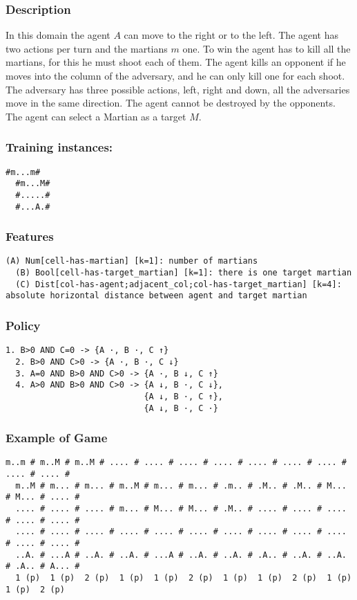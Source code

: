 \documentclass[a4paper]{article}
\begin{document}
\subsubsection{Description}
In this domain the agent $A$ can move to the right or to the left. The agent has two actions per turn and the martians $m$ one. To win the agent has to kill all the martians, for this he must shoot each of them. The agent kills an opponent if he moves into the column of the adversary, and he can only kill one for each shoot. The adversary has three possible actions, left, right and down, all the adversaries move in the same direction. The agent cannot be destroyed by the opponents. The agent can select a Martian as a target $M$.

\subsubsection{Training instances:}
\begin{Verbatim}[fontsize=\footnotesize]
  #m...m#
  #m...M#
  #.....#
  #...A.#
\end{Verbatim}

\subsubsection{Features}
\begin{Verbatim}[fontsize=\footnotesize]
  (A) Num[cell-has-martian] [k=1]: number of martians
  (B) Bool[cell-has-target_martian] [k=1]: there is one target martian
  (C) Dist[col-has-agent;adjacent_col;col-has-target_martian] [k=4]: absolute horizontal distance between agent and target martian
\end{Verbatim}

\subsubsection{Policy}
\begin{Verbatim}[fontsize=\footnotesize]
  1. B>0 AND C=0 -> {A ·, B ·, C ↑}
  2. B>0 AND C>0 -> {A ·, B ·, C ↓}
  3. A=0 AND B>0 AND C>0 -> {A ·, B ↓, C ↑}
  4. A>0 AND B>0 AND C>0 -> {A ↓, B ·, C ↓},
                            {A ↓, B ·, C ↑},
                            {A ↓, B ·, C ·}
\end{Verbatim}

\subsubsection{Example of Game}
\begin{Verbatim}[fontsize=\footnotesize]
  m..m # m..M # m..M # .... # .... # .... # .... # .... # .... # .... # .... # .... #
  m..M # m... # m... # m..M # m... # m... # .m.. # .M.. # .M.. # M... # M... # .... #
  .... # .... # .... # m... # M... # M... # .M.. # .... # .... # .... # .... # .... #
  .... # .... # .... # .... # .... # .... # .... # .... # .... # .... # .... # .... #
  ..A. # ...A # ..A. # ..A. # ...A # ..A. # ..A. # .A.. # ..A. # ..A. # .A.. # A... #
  1 (p)  1 (p)  2 (p)  1 (p)  1 (p)  2 (p)  1 (p)  1 (p)  2 (p)  1 (p)  1 (p)  2 (p)
\end{Verbatim}
\end{document}
